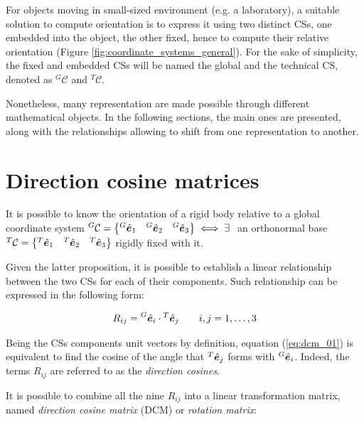 \begin{appendices}
For objects moving in small-sized environment (e.g. a laboratory), a suitable solution to compute orientation is to express it using two distinct CSs, one embedded into the object, the other fixed, hence to compute their relative orientation (Figure \ref{fig:coordinate_systems_general}). For the sake of simplicity, the fixed and embedded CSs will be named the global and the technical CS, denoted as ${^G}{}\mathcal{C}$ and ${^T}{}\mathcal{C}$.

Nonetheless, many representation are made possible through different mathematical objects. In the following sections, the main ones are presented, along with the relationships allowing to shift from one representation to another. 

\section{Direction cosine matrices}
\begin{proposition}
It is possible to know the orientation of a rigid body relative to a global coordinate system ${^G}{}\mathcal{C} = \begin{Bmatrix} {^G}{}\hat{\bm{e}}_1 & {^G}{}\hat{\bm{e}}_2 & {^G}{}\hat{\bm{e}}_3 \end{Bmatrix} \iff \exists\ $ an orthonormal base ${^T}{}\mathcal{C} = \begin{Bmatrix} {^T}{}\hat{\bm{e}}_1 & {^T}{}\hat{\bm{e}}_2 & {^T}{}\hat{\bm{e}}_3 \end{Bmatrix}$ rigidly fixed with it.
\end{proposition}

Given the latter proposition, it is possible to establish a linear relationship between the two CSs for each of their components. Such relationship can be expressed in the following form:

\begin{equation}\label{eq:dcm_01}
    R_{ij} = {^G}{}\hat{\bm{e}}_i \cdot {^T}{}\hat{\bm{e}}_j \quad \quad i,j = 1, \dots, 3
\end{equation}

Being the CSs components unit vectors by definition, equation (\ref{eq:dcm_01}) is equivalent to find the cosine of the angle that ${^T}{}\hat{\bm{e}}_j$ forms with ${^G}{}\hat{\bm{e}}_i$. Indeed, the terms $R_{ij}$ are referred to as the \textit{direction cosines}.

It is possible to combine all the nine $R_{ij}$ into a linear transformation matrix, named \textit{direction cosine matrix} (DCM) or \textit{rotation matrix}:


\end{appendices}
